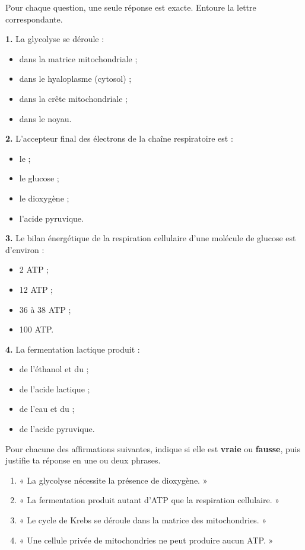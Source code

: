 \documentclass[11pt]{article}
\begin{document}
\begin{exercice}
Pour chaque question, une seule réponse est exacte. Entoure la lettre correspondante.

\textbf{1.} La glycolyse se déroule :
\begin{itemize}
\item[a)] dans la matrice mitochondriale ;
\item[b)] dans le hyaloplasme (cytosol) ;
\item[c)] dans la crête mitochondriale ;
\item[d)] dans le noyau.
\end{itemize}

\textbf{2.} L'accepteur final des électrons de la chaîne respiratoire est :
\begin{itemize}
\item[a)] le  ;
\item[b)] le glucose ;
\item[c)] le dioxygène  ;
\item[d)] l'acide pyruvique.
\end{itemize}

\textbf{3.} Le bilan énergétique de la respiration cellulaire d'une molécule de glucose est d'environ :
\begin{itemize}
\item[a)] 2 ATP ;
\item[b)] 12 ATP ;
\item[c)] 36 à 38 ATP ;
\item[d)] 100 ATP.
\end{itemize}

\textbf{4.} La fermentation lactique produit :
\begin{itemize}
\item[a)] de l'éthanol et du  ;
\item[b)] de l'acide lactique ;
\item[c)] de l'eau et du  ;
\item[d)] de l'acide pyruvique.
\end{itemize}
\end{exercice}

\begin{exercice}
Pour chacune des affirmations suivantes, indique si elle est \textbf{vraie} ou \textbf{fausse}, puis justifie ta réponse en une ou deux phrases.

\begin{enumerate}
\item « La glycolyse nécessite la présence de dioxygène. »
\item « La fermentation produit autant d'ATP que la respiration cellulaire. »
\item « Le cycle de Krebs se déroule dans la matrice des mitochondries. »
\item « Une cellule privée de mitochondries ne peut produire aucun ATP. »
\end{enumerate}
\end{exercice}
\end{document}
